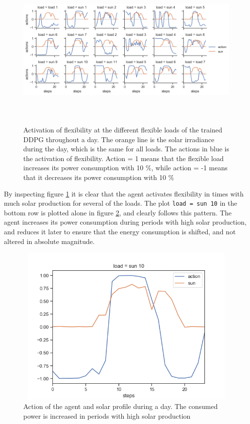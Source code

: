 \documentclass[class=book, crop=false]{standalone}
\begin{document}
\begin{figure}[ht]
    \center
    \includegraphics[height=8cm, width=15cm]{figures/configuration1.png}
    \caption[size = 9]{Activation of flexibility at the different flexible loads of the trained DDPG throughout a day. The orange line is the solar irradiance during the day, which is the same for all loads. The actions in blue is the activation of flexibility. Action = 1 means that the flexible load increases its power consumption with 10 \%, while action = -1 means that it decreases its power consumption with 10 \%}
    \label{fig:results:configuration1}
\end{figure}
By inspecting figure \ref{fig:results:configuration1} it is clear that the agent activates flexibility in times with much solar production for several of the loads. The plot \texttt{load = sun 10} in the bottom row is plotted alone in figure \ref{fig:results:configuration1_follows_sun}, and clearly follows this pattern. The agent increases its power consumption during periods with high solar production, and reduces it later to ensure that the energy consumption is shifted, and not altered in absolute magnitude.

\begin{figure}[H]
    \center
\includegraphics[height=8cm, width=12cm]{figures/configuration1_follows_sun.png}
    \caption[size = 9]{Action of the agent and solar profile during a day. The consumed power is increased in periods with high solar production}
    \label{fig:results:configuration1_follows_sun}
\end{figure}
\end{document}
